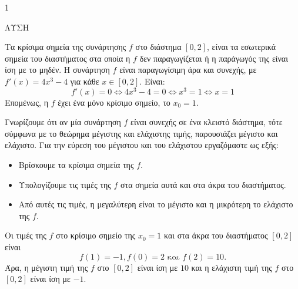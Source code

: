 \begin{ylh}{1}
    \item [Ύλη από εικόνα]
\end{ylh}
ΛΥΣΗ
\begin{alist}
    \item Τα κρίσιμα σημεία της συνάρτησης $f$ στο διάστημα $[0,2]$, είναι τα εσωτερικά σημεία του διαστήματος στα οποία η $f$ δεν παραγωγίζεται ή η παράγωγός της είναι ίση με το μηδέν.
    Η συνάρτηση $f$ είναι παραγωγίσιμη άρα και συνεχής, με $f'(x) = 4x^3 - 4$ για κάθε $x \in [0,2]$. Είναι:
    \[ f'(x) = 0 \Leftrightarrow 4x^3 - 4 = 0 \Leftrightarrow x^3 = 1 \Leftrightarrow x = 1 \]
    Επομένως, η $f$ έχει ένα μόνο κρίσιμο σημείο, το $x_0 = 1$.
    \item Γνωρίζουμε ότι αν μία συνάρτηση $f$ είναι συνεχής σε ένα κλειστό διάστημα, τότε σύμφωνα με το θεώρημα μέγιστης και ελάχιστης τιμής, παρουσιάζει μέγιστο και ελάχιστο.
    Για την εύρεση του μέγιστου και του ελάχιστου εργαζόμαστε ως εξής:
    \begin{itemize}
        \item Βρίσκουμε τα κρίσιμα σημεία της $f$.
        \item Υπολογίζουμε τις τιμές της $f$ στα σημεία αυτά και στα άκρα του διαστήματος.
        \item Από αυτές τις τιμές, η μεγαλύτερη είναι το μέγιστο και η μικρότερη το ελάχιστο της $f$.
    \end{itemize}
    Οι τιμές της $f$ στο κρίσιμο σημείο της $x_0 = 1$ και στα άκρα του διαστήματος $[0,2]$ είναι
    \[ f(1) = -1, f(0) = 2 \text{ και } f(2) = 10. \]
    Άρα, η μέγιστη τιμή της $f$ στο $[0,2]$ είναι ίση με $10$ και η ελάχιστη τιμή της $f$ στο $[0,2]$ είναι ίση με $-1$.
\end{alist}